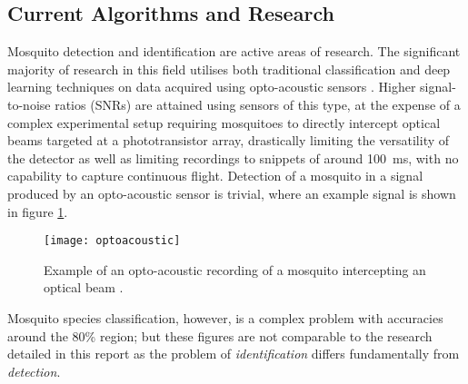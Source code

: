 
    
    \subsection{Current Algorithms and Research}
    \label{subsec:bg-litreview-currentalgs}
        Mosquito detection and identification are active areas of research. The significant majority of research in this field utilises both traditional classification and deep learning techniques on data acquired using opto-acoustic sensors \cite{Batista,Moore1991,Moore1986,Rahuman2016,Moore2002,Li2005,Chen2014,Silva2013}. Higher signal-to-noise ratios (SNRs) are attained using sensors of this type, at the expense of a complex experimental setup requiring mosquitoes to directly intercept optical beams targeted at a phototransistor array, drastically limiting the versatility of the detector as well as limiting recordings to snippets of around \SI{100}{ms}, with no capability to capture continuous flight. Detection of a mosquito in a signal produced by an opto-acoustic sensor is trivial, where an example signal is shown in figure \ref{fig:bg-litreview-currentalgs-opto}.
        \begin{figure}[ht]
            \centering
            \texttt{[image: optoacoustic]}
            \caption{Example of an opto-acoustic recording of a mosquito intercepting an optical beam \cite{Chen2014}.}
            \label{fig:bg-litreview-currentalgs-opto}
        \end{figure}
        Mosquito species classification, however, is a complex problem with accuracies around the 80\% region; but these figures are not comparable to the research detailed in this report as the problem of \textit{identification} differs fundamentally from \textit{detection}.
        
